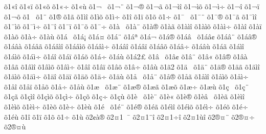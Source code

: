 {^^f51^^ab^^ee
^^f51^^ab^^ef
^^f51^^ab^^f5
^^f51^^ab^^f7
^^f51^^ab^^f9
^^f51^^ac^^a0
^^f51^^ac^^a8
^^f51^^ac^^ae
^^f51^^ac^^e3
^^f51^^ac^^ec^^ee
^^f51^^ac^^ec^^f5
^^f51^^ac^^ec^^f7
^^f51^^ac^^ee
^^f51^^ac^^ef
^^f51^^ac^^f5
^^f51^^ad^^a0
^^f51^^ad^^a8
^^f51^^ad^^ae
^^f51^^ad^^e3
^^f51^^ad^^ec^^ee
^^f51^^ad^^ec^^f5
^^f51^^ad^^ec^^f7
^^f51^^ad^^ee
^^f51^^ad^^ef
^^f51^^ad^^f5
^^f51^^ad^^f7
^^f51^^af^^a0
^^f51^^af^^a8
^^f51^^af^^ae
^^f51^^af^^e3
^^f51^^af^^ec^^ee
^^f51^^af^^ec^^f5
^^f51^^af^^ec^^f7
^^f51^^af^^ee
^^f51^^af^^ef
^^f51^^af^^f5
^^f51^^af^^f7
^^f51^^e0^^a0
^^f51^^e0^^a8
^^f51^^e0^^ae
^^f51^^e0^^e3
^^f51^^e0^^ec^^ee
^^f51^^e0^^ec^^f5
^^f51^^e0^^ec^^f7
^^f51^^e0^^ee
^^f51^^e0^^ef
^^f51^^e0^^f5
^^f51^^e0^^f7
^^f51^^e0^^f9
^^f51^^e1^^a0
^^f51^^e1^^a1
^^f51^^e1^^a4
^^f51^^e1^^a8
^^f51^^e1^^aa
^^f51^^e1^^ac
^^f51^^e1^^ae
^^f51^^e1^^e2^^a0
^^f51^^e1^^e2^^a2
^^f51^^e1^^e2^^a8
^^f51^^e1^^e2^^ae
^^f51^^e1^^e2^^e0
^^f51^^e1^^e2^^e3
^^f51^^e1^^e2^^ec^^ee
^^f51^^e1^^e2^^ec^^f5
^^f51^^e1^^e2^^ec^^f7
^^f51^^e1^^e2^^ee
^^f51^^e1^^e2^^ef
^^f51^^e1^^e2^^f5
^^f51^^e1^^e2^^f7
^^f51^^e1^^e2^^f9
^^f51^^e1^^e3
^^f51^^e1^^ec^^ee
^^f51^^e1^^ec^^f5
^^f51^^e1^^ec^^f7
^^f51^^e1^^ee
^^f51^^e1^^ef
^^f51^^e1^^f5
^^f51^^e1^^f7
^^f51^^e1^^f9
^^f51^^e12^^a3
^^f51^^e2^^a0
^^f51^^e2^^a2
^^f51^^e2^^a8
^^f51^^e2^^ab
^^f51^^e2^^ae
^^f51^^e2^^e0
^^f51^^e2^^e3
^^f51^^e2^^ec^^ee
^^f51^^e2^^ec^^f5
^^f51^^e2^^ec^^f7
^^f51^^e2^^ee
^^f51^^e2^^ef
^^f51^^e2^^f5
^^f51^^e2^^f7
^^f51^^e2^^f9
^^f51^^e32
^^f51^^e4^^a0
^^f51^^e4^^a8
^^f51^^e4^^ae
^^f51^^e4^^e3
^^f51^^e4^^ec^^ee
^^f51^^e4^^ec^^f5
^^f51^^e4^^ec^^f7
^^f51^^e4^^ee
^^f51^^e4^^ef
^^f51^^e4^^f5
^^f51^^e4^^f7
^^f51^^e4^^f9
^^f51^^e5^^a0
^^f51^^e5^^a8
^^f51^^e5^^ae
^^f51^^e5^^e3
^^f51^^e5^^ec^^ee
^^f51^^e5^^ec^^f5
^^f51^^e5^^ec^^f7
^^f51^^e5^^ee
^^f51^^e5^^ef
^^f51^^e5^^f5
^^f51^^e5^^f7
^^f51^^e5^^f9
^^f51^^e6^^a0
^^f51^^e6^^a8
^^f51^^e6^^ae
^^f51^^e6^^e3
^^f51^^e6^^f5
^^f51^^e6^^f7
^^f51^^e6^^f9
^^f51^^e7^^a0
^^f51^^e7^^a8
^^f51^^e7^^e3
^^f51^^e7^^ec^^ee
^^f51^^e7^^ec^^f5
^^f51^^e7^^ec^^f7
^^f51^^e7^^f5
^^f51^^e7^^f7
^^f51^^e7^^f9
^^f51^^e8^^a0
^^f51^^e8^^a8
^^f51^^e8^^ab
^^f51^^e8^^ae
^^f51^^e8^^e2^^a0
^^f51^^e8^^e3
^^f51^^e8^^ec^^ee
^^f51^^e8^^ec^^f5
^^f51^^e8^^ec^^f7
^^f51^^e8^^f5
^^f51^^e8^^f7
^^f51^^e8^^f9
^^f51^^e9^^a0
^^f51^^e9^^a8
^^f51^^e9^^ae
^^f51^^e9^^e3
^^f51^^e9^^ec^^ee
^^f51^^e9^^ec^^f5
^^f51^^e9^^ec^^f7
^^f51^^e9^^f5
^^f51^^e9^^f7
^^f51^^e9^^f9
^^f51^^ee
^^f51^^ef
^^f51^^f5
^^f51^^f7
^^f51^^f9
^^f52^^a2^^e0^^ae
^^f52^^a41^^a0^^af
^^f52^^a41^^a8^^ee
^^f52^^a41^^f7^^ee
^^f52^^a41^^f9^^ee
^^f52^^ae^^a4^^a8
^^f52^^ae^^a4^^f7
^^f52^^ae^^a4^^f9
}
